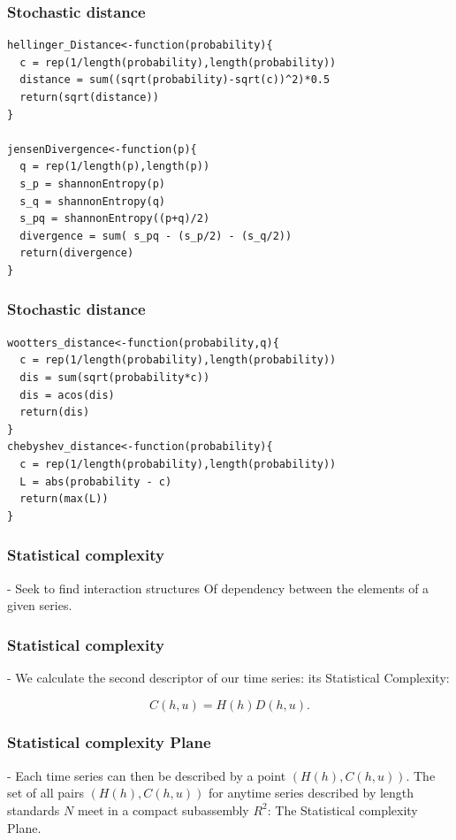 \documentclass[10pt, compress]{beamer}
\begin{document}
\begin{frame}[fragile]
\frametitle{Stochastic distance}
 \begin{lstlisting}
hellinger_Distance<-function(probability){
  c = rep(1/length(probability),length(probability))
  distance = sum((sqrt(probability)-sqrt(c))^2)*0.5
  return(sqrt(distance))
}

jensenDivergence<-function(p){
  q = rep(1/length(p),length(p))
  s_p = shannonEntropy(p)
  s_q = shannonEntropy(q)
  s_pq = shannonEntropy((p+q)/2)
  divergence = sum( s_pq - (s_p/2) - (s_q/2))
  return(divergence)
}
\end{lstlisting}
\end{frame}

\begin{frame}[fragile]
\frametitle{Stochastic distance}
 \begin{lstlisting}
wootters_distance<-function(probability,q){
  c = rep(1/length(probability),length(probability))
  dis = sum(sqrt(probability*c))
  dis = acos(dis)
  return(dis)
}
chebyshev_distance<-function(probability){
  c = rep(1/length(probability),length(probability))
  L = abs(probability - c)
  return(max(L))
}
\end{lstlisting}
\end{frame}

 
\begin{frame}[fragile]
\frametitle{Statistical complexity}

- Seek to find interaction structures
Of dependency between the elements of a given series.

\end{frame}
 
\begin{frame}[fragile]
\frametitle{Statistical complexity}

- We calculate the second descriptor of our time series: its Statistical Complexity:

\begin{equation}
C( h, u) = H( h) D( h,  u).
\end{equation}

\end{frame}

\begin{frame}[fragile]
\frametitle{Statistical complexity Plane}

- Each time series can then be described by a point $(H( h), C( h,  u))$.
The set of all pairs $(H( h), C( h,  u))$ for anytime series described by length standards $N$ meet in a compact subassembly $ R^2$: The Statistical complexity Plane.

\end{frame}
\end{document}
